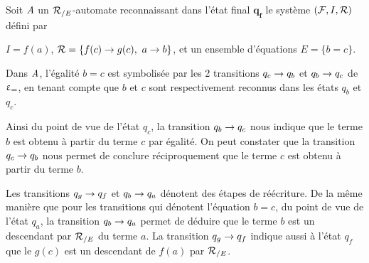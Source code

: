 \begin{example}
  \label{ex:semantics}
  Soit $\mathit A$ un ${\mathcal R_{/E}}$-automate reconnaissant dans l'état final $\mathbf{q_f}$
  le système $(\mathcal{F}, I, \mathcal R)$ défini par 

  $I = f(a)$, $\mathcal R = \{f(c) \rightarrow g(c),\ a \rightarrow b\}$, et un ensemble d'équations $E = \{ b = c\}$.

  Dans $\mathit A$, l'égalité $b = c$ est symbolisée par les 2 transitions $q_c
  \rightarrow q_b$ et $q_b \rightarrow q_c$ de $\upvarepsilon_{=}$, en tenant compte que $b$ et $c$
  sont respectivement reconnus dans les états $q_b$ et $q_c$.
  
  Ainsi du point de vue de l'état $q_c$, la transition $q_b \rightarrow q_c$
  nous indique que le terme $b$ est obtenu à partir du terme $c$ par égalité.
  On peut constater que la transition $q_c \rightarrow q_b$ nous permet 
  de conclure réciproquement que le terme $c$ est obtenu à partir du terme $b$.

  Les transitions $q_g \rightarrow q_f$ et $q_b \rightarrow q_a$ dénotent des étapes de réécriture.
  De la même manière que pour les transitions qui dénotent l'équation $b=c$, du point
  de vue de l'état $q_a$, la transition $q_b \rightarrow q_a$ permet de déduire que le terme
  $b$ est un descendant par ${\mathcal R_{/E}}$ du terme $a$. La transition $q_g \rightarrow q_f$ indique 
  aussi à l'état $q_f$ que le $g(c)$ est un descendant de $f(a)$ par ${\mathcal R_{/E}}$.


\end{example}
